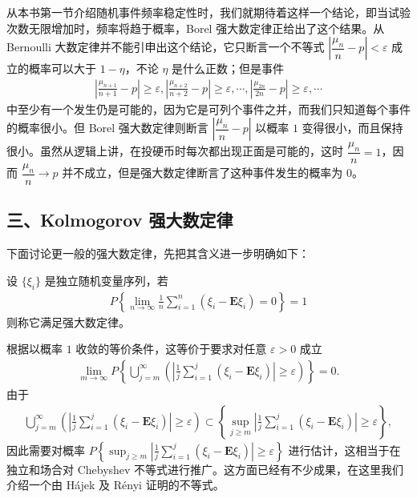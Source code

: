\documentclass[../../main.tex]{subfiles}
\begin{document}
从本书第一节介绍随机事件频率稳定性时，我们就期待着这样一个结论，即当试验次数无限增加时，频率将趋于概率，Borel 强大数定律正给出了这个结果。从 Bernoulli 大数定律并不能引申出这个结论，它只断言一个不等式 $\left|\dfrac{\mu_n}{n}-p\right|<\varepsilon$ 成立的概率可以大于 $1-\eta$，不论 $\eta$ 是什么正数；但是事件
\begin{align*}
\left|\frac{\mu_{n+1}}{n+1}-p\right|\geqslant\varepsilon,\left|\frac{\mu_{n+2}}{n+2}-p\right|\geqslant\varepsilon,\cdots,\left|\frac{\mu_{2n}}{2n}-p\right|\geqslant\varepsilon,\cdots
\end{align*}
中至少有一个发生仍是可能的，因为它是可列个事件之并，而我们只知道每个事件的概率很小。但 Borel 强大数定律则断言 $\left|\dfrac{\mu_n}{n}-p\right|$ 以概率 $1$ 变得很小，而且保持很小。虽然从逻辑上讲，在投硬币时每次都出现正面是可能的，这时 $\dfrac{\mu_n}{n}=1$，因而 $\dfrac{\mu_n}{n}\to p$ 并不成立，但是强大数定律断言了这种事件发生的概率为 $0$。

\subsection*{三、Kolmogorov 强大数定律}

下面讨论更一般的强大数定律，先把其含义进一步明确如下：

设 $\{\xi_i\}$ 是独立随机变量序列，若
\begin{align}
P\!\left\{\lim_{n\to\infty}\frac1n\sum_{i=1}^{n}(\xi_i-\boldsymbol{E}\xi_i)=0\right\}=1
\end{align}
则称它满足强大数定律。

根据以概率 $1$ 收敛的等价条件，这等价于要求对任意 $\varepsilon>0$ 成立
\begin{align}
\lim_{m\to\infty}P\!\left\{\bigcup_{j=m}^{\infty}\left(\left|\frac1j\sum_{i=1}^{j}(\xi_i-\boldsymbol{E}\xi_i)\right|\geqslant\varepsilon\right)\right\}=0.
\end{align}
由于
\begin{align}
\bigcup_{j=m}^{\infty}\left(\left|\frac1j\sum_{i=1}^{j}(\xi_i-\boldsymbol{E}\xi_i)\right|\geqslant\varepsilon\right)
\subset\left\{\sup_{j\geqslant m}\left|\frac1j\sum_{i=1}^{j}(\xi_i-\boldsymbol{E}\xi_i)\right|\geqslant\varepsilon\right\},
\end{align}
因此需要对概率 $P\left\{\sup_{j\geqslant m}\left|\frac1j\sum_{i=1}^{j}(\xi_i-\boldsymbol{E}\xi_i)\right|\geqslant\varepsilon\right\}$ 进行估计，这相当于在独立和场合对 Chebyshev 不等式进行推广。这方面已经有不少成果，在这里我们介绍一个由 Hájek 及 Rényi 证明的不等式。
\end{document}
